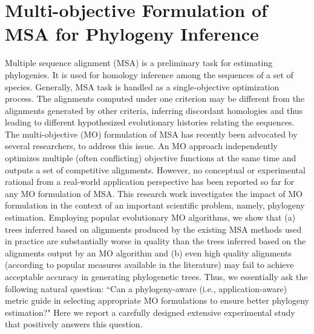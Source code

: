 

\graphicspath{{cybernatics/}}

\chapter{Multi-objective Formulation of MSA for Phylogeny Inference}
 Multiple sequence alignment (MSA) is a preliminary task for estimating phylogenies. It is used for homology inference among the sequences of a set of species. Generally, MSA task is handled as a single-objective optimization process.
The alignments computed under one criterion may be different from the alignments generated by other criteria, inferring discordant homologies and thus leading to different hypothesized evolutionary histories relating the sequences. The multi-objective (MO) formulation of MSA has recently been advocated by several researchers, to address this issue. An MO approach independently optimizes multiple (often conflicting) objective functions at the same time and outputs a set of competitive alignments. However, no conceptual or experimental rational from a real-world application perspective has been reported so far for any MO formulation of MSA. This research work investigates the impact of MO formulation in the context of an important scientific problem, namely, phylogeny estimation. Employing popular evolutionary MO algorithms, we show that (a) trees inferred based on alignments produced by the existing MSA methods used in practice are substantially worse in quality than the trees inferred based on the alignments output by an MO algorithm and
(b) even high quality alignments (according to popular measures available in the literature) may fail to achieve acceptable accuracy in generating phylogenetic trees.      
Thus, we essentially ask the following natural question: ``Can a phylogeny-aware (i.e., application-aware) metric guide in selecting appropriate MO formulations to ensure better phylogeny estimation?" Here we report a carefully designed extensive experimental study that positively answers this question. 







